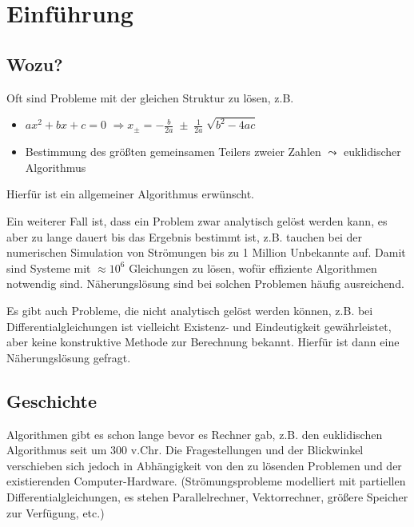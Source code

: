 %
%
%
%

\chapter{Einführung}
\section*{Wozu?}
Oft sind Probleme mit der gleichen Struktur zu lösen,
z.B.
\begin{itemize}
\item $ax^2 + bx + c  = 0$ $\Rightarrow x_{\pm} 
  = -\frac{b}{2a} \; \pm \; \frac{1}{2a} \; \sqrt{b^2-4ac}$
\item Bestimmung des größten gemeinsamen Teilers zweier
  Zahlen $\leadsto$ euklidischer Algorithmus 
\end{itemize}
Hierfür ist ein allgemeiner Algorithmus erwünscht.

Ein weiterer Fall ist, dass ein Problem zwar analytisch gelöst werden kann, es aber
zu lange dauert bis das Ergebnis bestimmt ist,  
z.B. tauchen bei der
numerischen Simulation von Strömungen bis zu 1
Million Unbekannte auf. Damit sind Systeme mit $\approx 10^6$
Gleichungen zu lösen, wofür effiziente Algorithmen notwendig sind.
Näherungslösung sind bei solchen Problemen häufig ausreichend.

Es gibt auch Probleme, die nicht analytisch gelöst werden können, z.B.
bei Differentialgleichungen ist vielleicht Existenz- und
Eindeutigkeit gewährleistet, aber keine konstruktive Methode zur
Berechnung bekannt.
Hierfür ist dann eine Näherungslösung gefragt.


\section*{Geschichte}
Algorithmen gibt es schon lange bevor es Rechner gab, z.B. den
euklidischen Algorithmus seit um 300 v.Chr. Die Fragestellungen
und der Blickwinkel verschieben sich jedoch in Abhängigkeit von
den zu lösenden Problemen und der existierenden Computer-Hardware.
(Strömungsprobleme modelliert mit partiellen
Differentialgleichungen,  es stehen Parallelrechner,  Vektorrechner, 
größere Speicher zur Verfügung, etc.)

